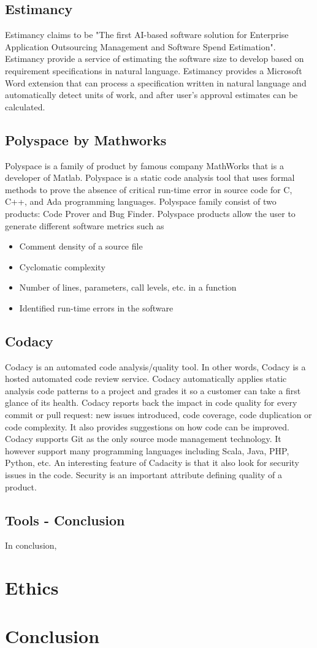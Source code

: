 \documentclass[11pt]{article}
\begin{document}
\subsection{Estimancy}
Estimancy claims to be "The first AI-based software solution for Enterprise Application Outsourcing Management and Software Spend Estimation". Estimancy provide a service of estimating the software size to develop based on requirement specifications in natural language. Estimancy provides a Microsoft Word extension that can process a specification written in natural language and automatically detect units of work, and after user's approval estimates can be calculated.
\subsection{Polyspace by Mathworks}
Polyspace is a family of product by famous company MathWorks that is a developer of Matlab. Polyspace is a static code analysis tool that uses formal methods to prove the absence of critical run-time error in source code for C, C++, and Ada programming languages. Polyspace family consist of two products: Code Prover and Bug Finder.
Polyspace products allow the user to generate different software metrics such as
\begin{itemize}
	\item Comment density of a source file
	\item Cyclomatic complexity
	\item Number of lines, parameters, call levels, etc. in a function
	\item Identified run-time errors in the software
\end{itemize}

\subsection{Codacy}
Codacy is an automated code analysis/quality tool. In other words, Codacy is a hosted automated code review service. 
Codacy automatically applies static analysis code patterns to a project and grades it so a customer can take a first glance of its health. Codacy reports back the impact in code quality for every commit or pull request: new issues introduced, code coverage, code duplication or code complexity. It also provides suggestions on how code can be improved. Codacy supports Git as the only source mode management technology. It however support many programming languages including Scala, Java, PHP, Python, etc. An interesting feature of Cadacity is that it also look for security issues in the code. Security is an important attribute defining quality of a product.
\subsection{Tools - Conclusion}
In conclusion, 
\section{Ethics}
\label{sec:Ethics}

\section{Conclusion}
\label{sec:Conclusion}

%

 
\end{document}
